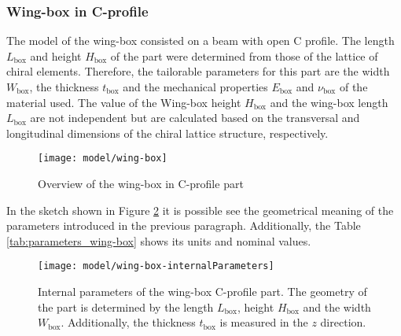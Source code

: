 \subsubsection{Wing-box in C-profile} \label{subsubsec:wingBox_Parametrization}

The model of the wing-box consisted on a beam with open C profile. The length $L_{\mathrm{box}}$ and height $H_{\mathrm{box}}$ of the part were determined from those of the lattice of chiral elements. Therefore, the tailorable parameters for this part are the width $W_{\mathrm{box}}$, the thickness $t_{\mathrm{box}}$ and the mechanical properties $E_{\mathrm{box}}$ and $\nu_{\mathrm{box}}$ of the material used. The value of the Wing-box height $H_{\mathrm{box}}$ and the wing-box length $L_{\mathrm{box}}$ are not independent but are calculated based on the transversal and longitudinal dimensions of the chiral lattice structure, respectively.

\begin{figure}[!htpb]
  \centering
  \texttt{[image: model/wing-box]}
  \caption[Overview of the wing-box in C-profile part]{Overview of the wing-box in C-profile part}\label{fig:wing-box}
\end{figure}

In the sketch shown in Figure \ref{fig:wing-box-internalParameters} it is possible see the geometrical meaning of the parameters introduced in the previous paragraph. Additionally, the Table \ref{tab:parameters_wing-box} shows its units and nominal values.

\begin{figure}[!htpb]
  \centering
  \texttt{[image: model/wing-box-internalParameters]}
  \caption[Internal parameters of the wing-box in C-profile part]{Internal parameters of the wing-box C-profile part. The geometry of the part is determined by the length $L_{\mathrm{box}}$, height $H_{\mathrm{box}}$ and the width $W_{\mathrm{box}}$. Additionally, the thickness $t_{\mathrm{box}}$ is measured in the $z$ direction.}\label{fig:wing-box-internalParameters}
\end{figure}

